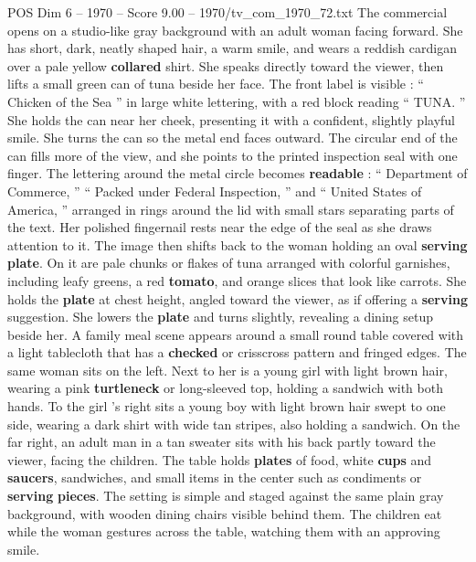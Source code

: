 \begin{textsample}{POS Dim 6 – 1970 – Score 9.00 – 1970/tv\_com\_1970\_72.txt}  \label{ex:f6_pos_046}
The commercial opens on a studio-like gray background with an adult woman facing forward.
She has short, dark, neatly shaped hair, a warm smile, and wears a reddish cardigan over a pale yellow \textbf{collared} shirt.
She speaks directly toward the viewer, then lifts a small green can of tuna beside her face.
The front label is visible : “ Chicken of the Sea ” in large white lettering, with a red block reading “ TUNA. ” She holds the can near her cheek, presenting it with a confident, slightly playful smile.
She turns the can so the metal end faces outward.
The circular end of the can fills more of the view, and she points to the printed inspection seal with one finger.
The lettering around the metal circle becomes \textbf{readable} : “ Department of Commerce, ” “ Packed under Federal Inspection, ” and “ United States of America, ” arranged in rings around the lid with small stars separating parts of the text.
Her polished fingernail rests near the edge of the seal as she draws attention to it.
The image then shifts back to the woman holding an oval \textbf{serving} \textbf{plate}.
On it are pale chunks or flakes of tuna arranged with colorful garnishes, including leafy greens, a red \textbf{tomato}, and orange slices that look like carrots.
She holds the \textbf{plate} at chest height, angled toward the viewer, as if offering a \textbf{serving} suggestion.
She lowers the \textbf{plate} and turns slightly, revealing a dining setup beside her.
A family meal scene appears around a small round table covered with a light tablecloth that has a \textbf{checked} or crisscross pattern and fringed edges.
The same woman sits on the left.
Next to her is a young girl with light brown hair, wearing a pink \textbf{turtleneck} or long-sleeved top, holding a sandwich with both hands.
To the girl ’s right sits a young boy with light brown hair swept to one side, wearing a dark shirt with wide tan stripes, also holding a sandwich.
On the far right, an adult man in a tan sweater sits with his back partly toward the viewer, facing the children.
The table holds \textbf{plates} of food, white \textbf{cups} and \textbf{saucers}, sandwiches, and small items in the center such as condiments or \textbf{serving} \textbf{pieces}.
The setting is simple and staged against the same plain gray background, with wooden dining chairs visible behind them.
The children eat while the woman gestures across the table, watching them with an approving smile.

\end{textsample}
